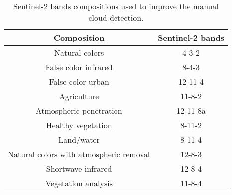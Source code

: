 \begin{table}[h!t!]
\caption{Sentinel-2 bands compositions used to improve the manual cloud detection.}
\label{tab:color_compositions}
\center
    \begin{tabular}{cc}
        \hline
        Composition                             & Sentinel-2 bands \\ \hline
        Natural colors                          & 4-3-2            \\
        False color infrared                    & 8-4-3            \\
        False color urban                       & 12-11-4          \\
        Agriculture                             & 11-8-2           \\
        Atmospheric penetration                 & 12-11-8a         \\
        Healthy vegetation                      & 8-11-2           \\
        Land/water                              & 8-11-4           \\
        Natural colors with atmospheric removal & 12-8-3           \\
        Shortwave infrared                      & 12-8-4           \\
        Vegetation analysis                     & 11-8-4           \\ \hline        
    \end{tabular}
\end{table}

